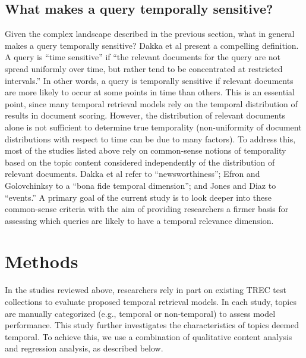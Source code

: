 \documentclass{sig-alternate}
\begin{document}
\subsection{What makes a query temporally sensitive?}

Given the complex landscape described in the previous section, what in general makes a query temporally sensitive? Dakka et al \cite{Dakka2012} present a compelling definition. A query is ``time sensitive''  if  ``the relevant documents for the query are not spread uniformly over time, but rather tend to be concentrated at restricted intervals.''  In other words, a query is temporally sensitive if relevant documents are more likely to occur at some points in time than others. This is an essential point, since many temporal retrieval models rely on the temporal distribution of results in document scoring. However, the distribution of relevant documents alone is not sufficient to determine true temporality (non-uniformity of document distributions with respect to time can be due to many factors). To address this, most of the studies listed above rely on common-sense notions of temporality based on the topic content considered independently of the distribution of relevant documents. Dakka et al refer to ``newsworthiness''; Efron and Golovchinksy to a ``bona fide temporal dimension''; and Jones and Diaz to ``events.''  A primary goal of the current study is to look deeper into these common-sense criteria with the aim of providing researchers a firmer basis for assessing which queries are likely to have a temporal relevance dimension.


\section{Methods}

In the studies reviewed above, researchers rely in part on existing TREC test collections to evaluate proposed temporal retrieval models. In each study, topics are manually categorized (e.g.,  temporal or non-temporal) to assess model performance. This study further investigates the characteristics of topics deemed temporal. To achieve this, we use a combination of qualitative content analysis and regression analysis, as described below.
\end{document}
